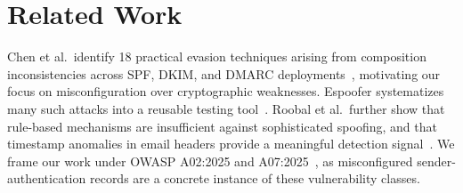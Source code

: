 \documentclass[conference, onecolumn, a4paper, 10pt]{IEEEtran}
\begin{document}
\section{Related Work}
Chen et al.\ identify 18 practical evasion techniques arising from composition inconsistencies across SPF, DKIM, and DMARC deployments~\cite{chen2020composition}, motivating our focus on misconfiguration over cryptographic weaknesses. Espoofer systematizes many such attacks into a reusable testing tool~\cite{chenjj_espoofer}. Roobal et al.\ further show that rule-based mechanisms are insufficient against sophisticated spoofing, and that timestamp anomalies in email headers provide a meaningful detection signal~\cite{roobal2025timestamp}. We frame our work under OWASP A02:2025 and A07:2025~\cite{owasp_a02_2025,owasp_a07_2025}, as misconfigured sender-authentication records are a concrete instance of these vulnerability classes.

\clearpage


\end{document}
